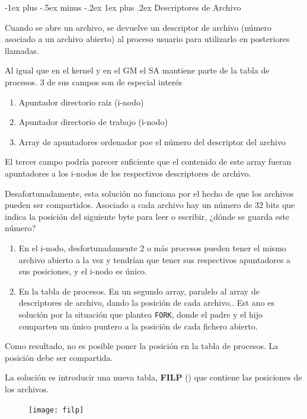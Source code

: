 \documentclass[10pt,portrait, twocolumn]{article}
\makeatletter
\renewcommand{\subsubsection}{\@startsection{subsubsection}{3}{0mm}%
                                {-1ex plus -.5ex minus -.2ex}%
                                {1ex plus .2ex}%
                                {\normalfont\small\bfseries}}
\makeatother
\begin{document}
\subsubsection{Descriptores de Archivo}

Cuando se abre un archivo, se devuelve un descriptor de archivo (número asociado a un archivo abierto) al proceso usuario para utilizarlo en posteriores llamadas. 

	\quad Al igual que en el kernel y en el GM el SA mantiene parte de la tabla de procesos. 3 de sus campos son de especial interés
	
	\begin{enumerate}
		\item Apuntador directorio raíz (i-nodo)
		\item Apuntador directorio de trabajo (i-nodo)
		\item Array de apuntadores ordenador poe el número del descriptor del archivo
	\end{enumerate}
	
El tercer campo podría parecer suficiente que el contenido de este array fueran apuntadores a los i-nodos de los respectivos descriptores de archivo.

	\quad Desafortunadamente, esta solución no funciona por el hecho de que los archivos pueden ser compartidos. Asociado a cada archivo hay un número de 32 bits que indica la posición del siguiente byte para leer o escribir, ¿dónde se guarda este número?
	
	\begin{enumerate}
		\item En el i-nodo, desfortunadamente 2 o más procesos pueden tener el mismo archivo abierto a la vez y tendrían que tener sus respectivos apuntadores a sus posiciones, y el i-nodo es único.
		\item En la tabla de procesos. En un segundo array, paralelo al array de descriptores de archivo, dando la posición de cada archivo.. Est ano es solución por la situación que plantea \texttt{FORK}, donde el padre y el hijo comparten un único puntero a la posición de cada fichero abierto.
	\end{enumerate}
	
Como resultado, no es posible poner la posición en la tabla de procesos. La posición debe ser compartida.

	\quad La solución es introducir una nueva tabla, \textbf{FILP} () que contiene las posiciones de los archivos.
	
\begin{figure}[!ht]
	\centering
	\texttt{[image: filp]}
\end{figure}
\end{document}
